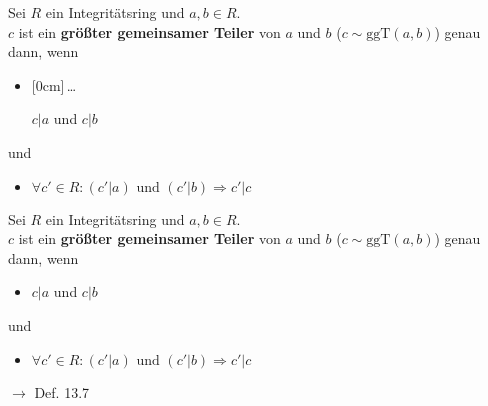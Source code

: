 \documentclass[11pt]{article}
\renewcommand{\cite}[1]{\par\bigskip\hfill{\color{gray}\tiny\(\to\) #1}}
\newcommand{\hide}[1]{\parbox{0cm}{\raisebox{-7pt}[0cm]{\dots}}\color{white}#1\color{black}}
\let\olddots\dots
\renewcommand{\dots}{\,\olddots\,}
\newenvironment{field}{}{\newpage}
\newif\ifnote
\newenvironment{note}{\notetrue}{\notefalse}
\newcommand{\localtag}{}
\newcommand{\globaltag}{}
\newcommand{\uuid}{}
\newcommand{\tags}[1]{
    \ifnote
        \renewcommand{\localtag}{#1}
    \else
        \renewcommand{\globaltag}{#1}
    \fi
    }
\newcommand{\xplain}[1]{\renewcommand{\uuid}{#1}}
\begin{document}
\begin{note}
    \tags{Def}
    \xplain{3024e3e1-e61b-40fe-890f-52ea6401dd61}

    \begin{field}
        Sei $R$ ein Integritätsring und $a,b\in R$.\\
        $c$ ist ein \textbf{größter gemeinsamer Teiler} von $a$ und $b$ ($c \sim \text{ggT}(a,b)$) genau dann, wenn
        \begin{itemize}
            \item \hide{$c\vert a$ und $c\vert b$}
        \end{itemize}
        und
        \begin{itemize}
            \item $\forall c'\in R\colon (c'\vert a) \text{ und } (c'\vert b) \Rightarrow c'\vert c$
        \end{itemize}
    \end{field}
    \begin{field}
        Sei $R$ ein Integritätsring und $a,b\in R$.\\
        $c$ ist ein \textbf{größter gemeinsamer Teiler} von $a$ und $b$ ($c \sim \text{ggT}(a,b)$) genau dann, wenn
        \begin{itemize}
            \item $c\vert a$ und $c\vert b$
        \end{itemize}
        und
        \begin{itemize}
            \item $\forall c'\in R\colon (c'\vert a) \text{ und } (c'\vert b) \Rightarrow c'\vert c$
        \end{itemize}
        \cite{Def. 13.7}
    \end{field}


\end{note}
\end{document}

